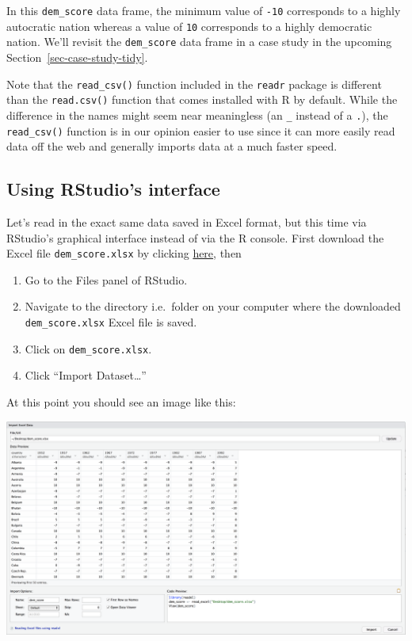 \documentclass[
  letterpaper,
  DIV=11,
  numbers=noendperiod]{scrreprt}
\providecommand{\tightlist}{%
  \setlength{\itemsep}{0pt}\setlength{\parskip}{0pt}}\usepackage{longtable,booktabs,array}
\theoremstyle{definition}
\theoremstyle{remark}
\begin{document}
In this \texttt{dem\_score} data frame, the minimum value of
\texttt{-10} corresponds to a highly autocratic nation whereas a value
of \texttt{10} corresponds to a highly democratic nation. We'll revisit
the \texttt{dem\_score} data frame in a case study in the upcoming
Section~\ref{sec-case-study-tidy}.

Note that the \texttt{read\_csv()} function included in the
\texttt{readr} package is different than the \texttt{read.csv()}
function that comes installed with R by default. While the difference in
the names might seem near meaningless (an \texttt{\_} instead of a
\texttt{.}), the \texttt{read\_csv()} function is in our opinion easier
to use since it can more easily read data off the web and generally
imports data at a much faster speed.

\hypertarget{using-rstudios-interface}{%
\subsection{Using RStudio's interface}\label{using-rstudios-interface}}

Let's read in the exact same data saved in Excel format, but this time
via RStudio's graphical interface instead of via the R console. First
download the Excel file \texttt{dem\_score.xlsx} by clicking
\href{https://moderndive.com/data/dem_score.xlsx}{here}, then

\begin{enumerate}
\def\labelenumi{\arabic{enumi}.}
\tightlist
\item
  Go to the Files panel of RStudio.
\item
  Navigate to the directory i.e.~folder on your computer where the
  downloaded \texttt{dem\_score.xlsx} Excel file is saved.
\item
  Click on \texttt{dem\_score.xlsx}.
\item
  Click ``Import Dataset\ldots{}''
\end{enumerate}

At this point you should see an image like this:

\includegraphics{images/read_excel.png}
\end{document}
